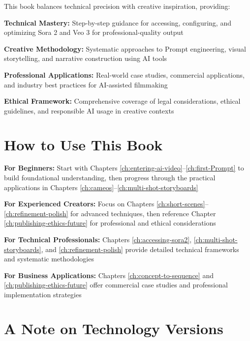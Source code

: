 \documentclass[11pt,a4paper,openright]{book}
\begin{document}
This book balances technical precision with creative inspiration, providing:

\textbf{Technical Mastery:} Step-by-step guidance for accessing, configuring, and optimizing Sora 2 and Veo 3 for professional-quality output

\textbf{Creative Methodology:} Systematic approaches to Prompt engineering, visual storytelling, and narrative construction using AI tools

\textbf{Professional Applications:} Real-world case studies, commercial applications, and industry best practices for AI-assisted filmmaking

\textbf{Ethical Framework:} Comprehensive coverage of legal considerations, ethical guidelines, and responsible AI usage in creative contexts

\section*{How to Use This Book}

\textbf{For Beginners:} Start with Chapters \ref{ch:entering-ai-video}--\ref{ch:first-Prompt} to build foundational understanding, then progress through the practical applications in Chapters \ref{ch:cameos}--\ref{ch:multi-shot-storyboards}

\textbf{For Experienced Creators:} Focus on Chapters \ref{ch:short-scenes}--\ref{ch:refinement-polish} for advanced techniques, then reference Chapter \ref{ch:publishing-ethics-future} for professional and ethical considerations

\textbf{For Technical Professionals:} Chapters \ref{ch:accessing-sora2}, \ref{ch:multi-shot-storyboards}, and \ref{ch:refinement-polish} provide detailed technical frameworks and systematic methodologies

\textbf{For Business Applications:} Chapters \ref{ch:concept-to-sequence} and \ref{ch:publishing-ethics-future} offer commercial case studies and professional implementation strategies

\section*{A Note on Technology Versions}

\begin{center}
\end{center}
\end{document}
